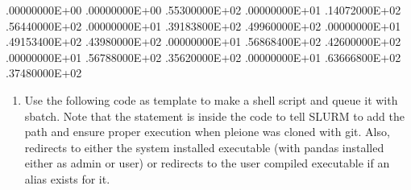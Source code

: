 \documentclass[letterpaper,10pt,english]{sphinxmanual}
\begin{document}
\begin{sphinxVerbatim}[commandchars=\\\{\}]
 .00000000E+00  .00000000E+00  .55300000E+02
 .00000000E+01  .14072000E+02  .56440000E+02
 .00000000E+01  .39183800E+02  .49960000E+02
 .00000000E+01  .49153400E+02  .43980000E+02
 .00000000E+01  .56868400E+02  .42600000E+02
 .00000000E+01  .56788000E+02  .35620000E+02
 .00000000E+01  .63666800E+02  .37480000E+02
\end{sphinxVerbatim}
\begin{enumerate}
\def\theenumi{\arabic{enumi}}
\def\labelenumi{\theenumi .}
\makeatletter\def\p@enumii{\p@enumi \theenumi .}\makeatother
\setcounter{enumi}{2}
\item {} 

Use the following code as template to make a shell script and queue it with
sbatch. Note that the  statement is inside the code to tell SLURM
to add the path and ensure proper execution when pleione was cloned with
git. Also,  redirects to either the system installed executable
(with pandas installed either as admin or user) or redirects to the user
compiled executable if an alias exists for it.

\end{enumerate}
\end{document}

